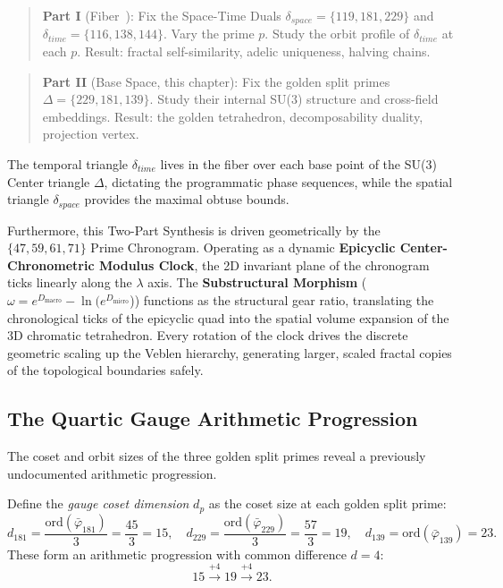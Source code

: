 \begin{quote}
\textbf{Part I} (Fiber~\cite{dwm_fst}): Fix the Space-Time Duals
$\delta_{space} = \{119, 181, 229\}$ and $\delta_{time} = \{116, 138, 144\}$.
Vary the prime $p$. Study the orbit profile of $\delta_{time}$ at
each $p$. Result: fractal self-similarity, adelic uniqueness,
halving chains.
\end{quote}

\begin{quote}
\textbf{Part II} (Base Space, this chapter): Fix the golden split primes
$\Delta = \{229, 181, 139\}$.
Study their internal SU(3) structure and cross-field embeddings.
Result: the golden tetrahedron, decomposability duality,
projection vertex.
\end{quote}

The temporal triangle $\delta_{time}$ lives in the fiber over each base point of the SU(3) Center triangle $\Delta$, dictating the programmatic phase sequences, while the spatial triangle $\delta_{space}$ provides the maximal obtuse bounds.

Furthermore, this Two-Part Synthesis is driven geometrically by the $\{47, 59, 61, 71\}$ Prime Chronogram. Operating as a dynamic \textbf{Epicyclic Center-Chronometric Modulus Clock}, the 2D invariant plane of the chronogram ticks linearly along the $\lambda$ axis. The \textbf{Substructural Morphism} ($\omega = e^{D_{\text{macro}}} - \ln(e^{D_{\text{micro}}}$)) functions as the structural gear ratio, translating the chronological ticks of the epicyclic quad into the spatial volume expansion of the 3D chromatic tetrahedron. Every rotation of the clock drives the discrete geometric scaling up the Veblen hierarchy, generating larger, scaled fractal copies of the topological boundaries safely.

\subsection{The Quartic Gauge Arithmetic Progression}
\label{sec:quartic_gauge}

The coset and orbit sizes of the three golden split primes reveal a previously undocumented arithmetic progression.

\begin{theorem}
\label{thm:quartic}
Define the \emph{gauge coset dimension} $d_p$ as the coset size at each golden split prime:
\[
d_{181} = \frac{\mathrm{ord}(\bar\varphi_{181})}{3} = \frac{45}{3} = 15, \quad
d_{229} = \frac{\mathrm{ord}(\bar\varphi_{229})}{3} = \frac{57}{3} = 19, \quad
d_{139} = \mathrm{ord}(\bar\varphi_{139}) = 23.
\]
These form an arithmetic progression with common difference $d = 4$:
\[
15 \xrightarrow{+4} 19 \xrightarrow{+4} 23.
\]
\end{theorem}

